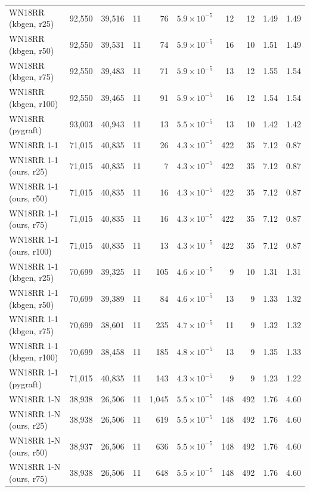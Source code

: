 \begin{tabular}{lrrrrrrrrr}
WN18RR (kbgen, r25) & 92{,}550 & 39{,}516 & 11 & 76 & $5.9\times10^{-5}$ & 12 & 12 & 1.49 & 1.49 \\
WN18RR (kbgen, r50) & 92{,}550 & 39{,}531 & 11 & 74 & $5.9\times10^{-5}$ & 16 & 10 & 1.51 & 1.49 \\
WN18RR (kbgen, r75) & 92{,}550 & 39{,}483 & 11 & 71 & $5.9\times10^{-5}$ & 13 & 12 & 1.55 & 1.54 \\
WN18RR (kbgen, r100) & 92{,}550 & 39{,}465 & 11 & 91 & $5.9\times10^{-5}$ & 16 & 12 & 1.54 & 1.54 \\
WN18RR (pygraft) & 93{,}003 & 40{,}943 & 11 & 13 & $5.5\times10^{-5}$ & 13 & 10 & 1.42 & 1.42 \\
\midrule
WN18RR 1-1 & 71{,}015 & 40{,}835 & 11 & 26 & $4.3\times10^{-5}$ & 422 & 35 & 7.12 & 0.87 \\
WN18RR 1-1 (ours, r25) & 71{,}015 & 40{,}835 & 11 & 7 & $4.3\times10^{-5}$ & 422 & 35 & 7.12 & 0.87 \\
WN18RR 1-1 (ours, r50) & 71{,}015 & 40{,}835 & 11 & 16 & $4.3\times10^{-5}$ & 422 & 35 & 7.12 & 0.87 \\
WN18RR 1-1 (ours, r75) & 71{,}015 & 40{,}835 & 11 & 16 & $4.3\times10^{-5}$ & 422 & 35 & 7.12 & 0.87 \\
WN18RR 1-1 (ours, r100) & 71{,}015 & 40{,}835 & 11 & 13 & $4.3\times10^{-5}$ & 422 & 35 & 7.12 & 0.87 \\
WN18RR 1-1 (kbgen, r25) & 70{,}699 & 39{,}325 & 11 & 105 & $4.6\times10^{-5}$ & 9 & 10 & 1.31 & 1.31 \\
WN18RR 1-1 (kbgen, r50) & 70{,}699 & 39{,}389 & 11 & 84 & $4.6\times10^{-5}$ & 13 & 9 & 1.33 & 1.32 \\
WN18RR 1-1 (kbgen, r75) & 70{,}699 & 38{,}601 & 11 & 235 & $4.7\times10^{-5}$ & 11 & 9 & 1.32 & 1.32 \\
WN18RR 1-1 (kbgen, r100) & 70{,}699 & 38{,}458 & 11 & 185 & $4.8\times10^{-5}$ & 13 & 9 & 1.35 & 1.33 \\
WN18RR 1-1 (pygraft) & 71{,}015 & 40{,}835 & 11 & 143 & $4.3\times10^{-5}$ & 9 & 9 & 1.23 & 1.22 \\
\midrule
WN18RR 1-N & 38{,}938 & 26{,}506 & 11 & 1{,}045 & $5.5\times10^{-5}$ & 148 & 492 & 1.76 & 4.60 \\
WN18RR 1-N (ours, r25) & 38{,}938 & 26{,}506 & 11 & 619 & $5.5\times10^{-5}$ & 148 & 492 & 1.76 & 4.60 \\
WN18RR 1-N (ours, r50) & 38{,}937 & 26{,}506 & 11 & 636 & $5.5\times10^{-5}$ & 148 & 492 & 1.76 & 4.60 \\
WN18RR 1-N (ours, r75) & 38{,}938 & 26{,}506 & 11 & 648 & $5.5\times10^{-5}$ & 148 & 492 & 1.76 & 4.60 \\

\end{tabular}
